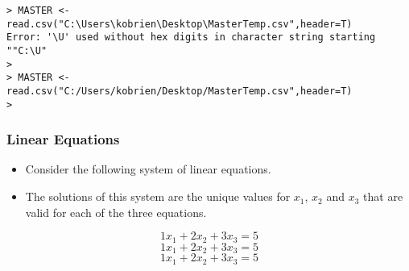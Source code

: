 \documentclass{beamer}
\begin{document}
\begin{frame}[fragile]
\begin{verbatim}
> MASTER <- read.csv("C:\Users\kobrien\Desktop\MasterTemp.csv",header=T)
Error: '\U' used without hex digits in character string starting ""C:\U"
> 
> MASTER <- read.csv("C:/Users/kobrien/Desktop/MasterTemp.csv",header=T)
> 

\end{verbatim}
\end{frame}





\begin{frame}
\frametitle{Linear Equations}
{
\large
\begin{itemize}
\item Consider the following system of linear equations. \item The solutions of this system are the unique values for $x_1$, $x_2$ and $x_3$ that are valid for each of the three equations.
\end{itemize}
\[1x_1 + 2x_2 + 3x_3 = 5 \]
\[1x_1 + 2x_2 + 3x_3 = 5 \]
\[1x_1 + 2x_2 + 3x_3 = 5 \]

}
\end{frame}
\end{document}
